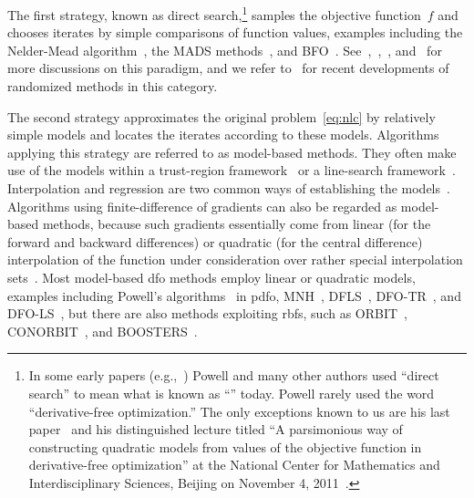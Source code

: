 \documentclass[manuscript,screen,review]{acmart}
\numberwithin{equation}{section}
\newcommand*{\obj}{f}
\begin{document}
The first strategy, known as direct search,\footnote{
    In some early papers (e.g.,~\cite{Powell_1994,Powell_1998}) Powell and many other authors used ``direct search'' to mean what is known as ``'' today.
    Powell rarely used the word ``derivative-free optimization.''
    The only exceptions known to us are his last paper~\cite{Powell_2015} and his distinguished lecture titled ``A parsimonious way of constructing quadratic models from values of the objective function in derivative-free optimization'' at the National Center for Mathematics and Interdisciplinary Sciences, Beijing on November 4, 2011~\cite{Buhmann_Fletcher_Iserles_Toint_2018}.
} samples the objective function~$\obj$ and chooses iterates by simple comparisons of function values, examples including the Nelder-Mead algorithm~\cite{Nelder_Mead_1965}, the MADS methods~\cite{Audet_Dennis_2006,Digabel_2011}, and BFO~\cite{Porcelli_Toint_2017,Porcelli_Toint_2020,Porcelli_Toint_2022}.
See~\cite{Kolda_Lewis_Torczon_2003},~\cite[Chapters~7 and~8]{Conn_Scheinberg_Vicente_2009b},~\mbox{\cite[Part~3]{Audet_Hare_2017}}, and~\mbox{\cite[\S~2.1]{Larson_Menickelly_Wild_2019}} for more discussions on this paradigm, and we refer to~\cite{Gratton_Etal_2015,Gratton_Etal_2019} for recent developments of randomized methods in this category.

The second strategy approximates the original problem~\eqref{eq:nlc} by relatively simple models and locates the iterates according to these models.
Algorithms applying this strategy are referred to as model-based methods.
They often make use of the models within a trust-region framework~\cite{Conn_Scheinberg_Vicente_2009a} or a line-search framework~\cite{Berahas_Byrd_Nocedal_2019}.
Interpolation and regression are two common ways of establishing the models~\cite{Powell_2001,Conn_Scheinberg_Vicente_2008a,Conn_Scheinberg_Vicente_2008b,Wild_Regis_Shoemaker_2008,Bandeira_Scheinberg_Vicente_2012,Billups_Larson_Graf_2013,Regis_Wild_2017}.
Algorithms using finite-difference of gradients can also be regarded as model-based methods, because such gradients essentially come from linear (for the forward and backward differences) or quadratic (for the central difference) interpolation of the function under consideration over rather special interpolation sets~\cite[\S~1.4.3]{Ragonneau_2022}.
Most model-based \gls{dfo} methods employ linear or quadratic models, examples including
Powell's algorithms~\cite{Powell_1994,Powell_2002,Powell_2006,Powell_2009} in \gls{pdfo}, MNH~\cite{Wild_2008}, DFLS~\cite{Zhang_Conn_Scheinberg_2010}, DFO-TR~\cite{Bandeira_Scheinberg_Vicente_2012}, and DFO-LS~\cite{Cartis_Etal_2019,Hough_Roberts_2022}, but there are also methods exploiting \glspl{rbf}, such as ORBIT~\cite{Wild_Regis_Shoemaker_2008}, CONORBIT~\cite{Regis_Wild_2017}, and BOOSTERS~\cite{Oeuvray_Bierlaire_2009}.
\end{document}
